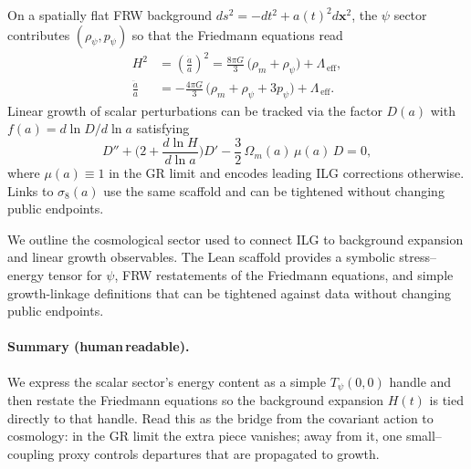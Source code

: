 \documentclass[aps,prd,twocolumn,superscriptaddress,nofootinbib,floatfix,longbibliography]{revtex4-2}
\newcommand{\vect}[1]{\boldsymbol{#1}}
\newcommand{\paren}[1]{\left( #1 \right)}
\begin{document}
On a spatially flat FRW background $ds^2=-dt^2+a(t)^2 d\vect{x}^2$, the $\psi$ sector contributes $(\rho_\psi, p_\psi)$ so that the Friedmann equations read
\begin{align}
  H^2 &= \paren{\frac{\dot a}{a}}^2 = \frac{8\pi G}{3}\,\big(\rho_m + \rho_\psi\big) + \Lambda_{\!\,\mathrm{eff}},
  \label{eq:friedmann1}\\
  \frac{\ddot a}{a} &= -\frac{4\pi G}{3}\,\big(\rho_m+\rho_\psi+3p_\psi\big) + \Lambda_{\!\,\mathrm{eff}}.
  \label{eq:friedmann2}
\end{align}
Linear growth of scalar perturbations can be tracked via the factor $D(a)$ with $f(a)=d\ln D/d\ln a$ satisfying
\begin{equation}
  D'' + \Big(2 + \frac{d\ln H}{d\ln a}\Big) D' - \frac{3}{2}\,\Omega_m(a)\,\mu(a)\, D = 0,
  \label{eq:growth}
\end{equation}
where $\mu(a)\equiv 1$ in the GR limit and encodes leading ILG corrections otherwise. Links to $\sigma_8(a)$ use the same scaffold and can be tightened without changing public endpoints.

We outline the cosmological sector used to connect ILG to background expansion and linear growth observables. The Lean scaffold provides a symbolic stress--energy tensor for $\psi$, FRW restatements of the Friedmann equations, and simple growth-linkage definitions that can be tightened against data without changing public endpoints.
%
\paragraph*{Summary (human\,readable).}
We express the scalar sector’s energy content as a simple $T_{\psi}(0,0)$ handle and then restate the Friedmann equations so the background expansion $H(t)$ is tied directly to that handle. Read this as the bridge from the covariant action to cosmology: in the GR limit the extra piece vanishes; away from it, one small–coupling proxy controls departures that are propagated to growth.
\end{document}
